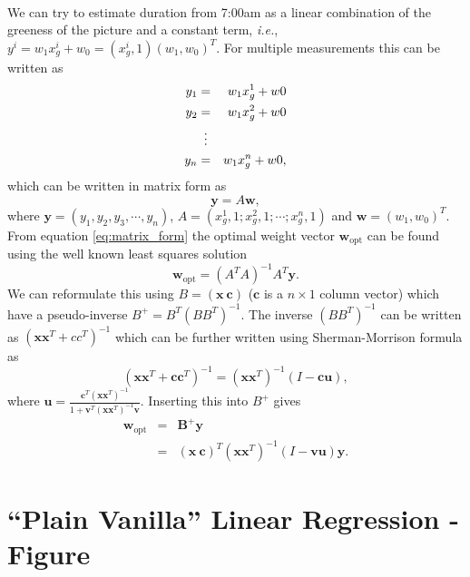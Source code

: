 \documentclass[article,11pt]{article}
\begin{document}
\\
We can try to estimate duration from 7:00am as a linear combination of the greeness of the picture and a constant term, \textit{i.e.}, $y^i= w_1x_g^i + w_0 = (x_g^i, 1)(w_1, w_0)^T$. For multiple measurements this can be written as
\begin{eqnarray}
  y_1 &=& w_1x_g^1 + w0\nonumber\\
  y_2 &=& w_1x_g^2 + w0\nonumber\\
  &\mathrel{\makebox[\widthof{=}]{\vdots}}\nonumber \\
  y_n &=& w_1x_g^n + w0,
\label{eq:equation-array}
\end{eqnarray}
which can be written in matrix form as
\begin{equation}
  \mathbf{y} = A\mathbf{w},
  \label{eq:matrix_form}
\end{equation}
where $\mathbf{y} = (y_1, y_2, y_3,\cdots,y_n)$, $A = (x_g^1,1; x_g^2,1;\cdots;x_g^n,1)$ and $\mathbf{w} = (w_1,w_0)^T$. From equation \ref{eq:matrix_form} the optimal weight vector $\mathbf{w}_{\mathrm{opt}}$ can be found using the well known least squares solution
\begin{equation}
  \mathbf{w}_{\mathrm{opt}} = (A^TA)^{-1}A^T\mathbf{y}.
  \label{eq:least-squares-solution}
\end{equation}
We can reformulate this using $B=(\mathbf{x}\:\mathbf{c})$ ($\mathbf{c}$
is a $n\times 1$ column vector) which have a pseudo-inverse $B^+=B^T(BB^T)^{-1}$.
The inverse $(BB^T)^{-1}$ can be written as $(\mathbf{x}\mathbf{x}^T + cc^T)^{-1}$
which can be further written using Sherman-Morrison formula as
\begin{equation}
  (\mathbf{x}\mathbf{x}^T+\mathbf{c}\mathbf{c}^T)^{-1}=(\mathbf{x}\mathbf{x}^T)^{-1}(I-\mathbf{c}\mathbf{u}),
  \label{eq:sherman-morrison}
\end{equation}
where $\mathbf{u} = \frac{\mathbf{c}^T(\mathbf{x}\mathbf{x}^T)^{-1}}{1+\mathbf{v}^T(\mathbf{x}\mathbf{x}^T)^{-1}\mathbf{v}}$. Inserting this into $B^+$ gives
\begin{eqnarray}
  \mathbf{w}_{\mathrm{opt}}&=&\mathbf{B}^+\mathbf{y}\nonumber\\
  &=&(\mathbf{x}\:\mathbf{c})^T(\mathbf{x}\mathbf{x}^T)^{-1}(I-\mathbf{v}\mathbf{u})\mathbf{y}.
\label{eq:closed-form-x}
\end{eqnarray}


\newpage
\section{``Plain Vanilla'' Linear Regression - Figure}
\label{problem_1}
\end{document}

